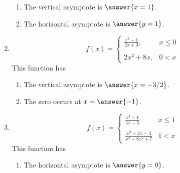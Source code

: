\documentclass{ximera}
\begin{document}
\begin{exercise}
\begin{enumerate}
\begin{exercise}
\begin{enumerate}
\item The vertical asymptote is $\answer{x=1}$.

\item The horizontal asymptote is $\answer{y=1}$.
\end{enumerate}
\end{exercise}

\item \begin{equation*}
	f(x) = \begin{cases}
		\frac{x^2-1}{2x+3},  & x \leq 0 \\
		\\
		2x^2+8x,  & 0 < x 
		\end{cases}
		\end{equation*}
This function has
\begin{selectAll}
\end{selectAll}
%
\begin{exercise}
\begin{enumerate}
\item The vertical asymptote is $\answer{x=-3/2}$.

\item The zero occurs at $x=\answer{-1}$.
\end{enumerate}
\end{exercise}

\item \begin{equation*}
	f(x) = \begin{cases}
		\frac{x^3-1}{4x-5}  & x \leq 1 \\
		\\
		\frac{x^2+2x -3}{x^4+8x^2+7}  & 1 < x
		\end{cases}
		\end{equation*}
This function has
\begin{selectAll}
\end{selectAll}
%
\begin{exercise}
\begin{enumerate}
\item The horizontal asymptote is $\answer{y=0}$.


\end{enumerate}
\end{exercise}
\end{enumerate}
\end{exercise}
\end{document}
